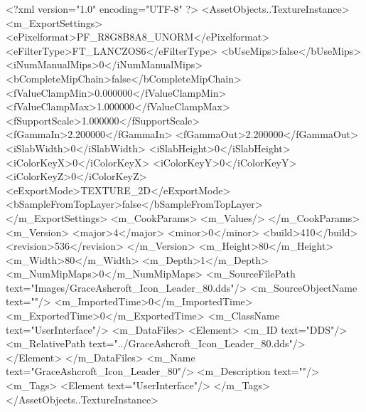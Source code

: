 <?xml version="1.0" encoding="UTF-8" ?>
<AssetObjects..TextureInstance>
	<m_ExportSettings>
		<ePixelformat>PF_R8G8B8A8_UNORM</ePixelformat>
		<eFilterType>FT_LANCZOS6</eFilterType>
		<bUseMips>false</bUseMips>
		<iNumManualMips>0</iNumManualMips>
		<bCompleteMipChain>false</bCompleteMipChain>
		<fValueClampMin>0.000000</fValueClampMin>
		<fValueClampMax>1.000000</fValueClampMax>
		<fSupportScale>1.000000</fSupportScale>
		<fGammaIn>2.200000</fGammaIn>
		<fGammaOut>2.200000</fGammaOut>
		<iSlabWidth>0</iSlabWidth>
		<iSlabHeight>0</iSlabHeight>
		<iColorKeyX>0</iColorKeyX>
		<iColorKeyY>0</iColorKeyY>
		<iColorKeyZ>0</iColorKeyZ>
		<eExportMode>TEXTURE_2D</eExportMode>
		<bSampleFromTopLayer>false</bSampleFromTopLayer>
	</m_ExportSettings>
	<m_CookParams>
		<m_Values/>
	</m_CookParams>
	<m_Version>
		<major>4</major>
		<minor>0</minor>
		<build>410</build>
		<revision>536</revision>
	</m_Version>
	<m_Height>80</m_Height>
	<m_Width>80</m_Width>
	<m_Depth>1</m_Depth>
	<m_NumMipMaps>0</m_NumMipMaps>
	<m_SourceFilePath text="Images/GraceAshcroft_Icon_Leader_80.dds"/>
	<m_SourceObjectName text=""/>
	<m_ImportedTime>0</m_ImportedTime>
	<m_ExportedTime>0</m_ExportedTime>
	<m_ClassName text="UserInterface"/>
	<m_DataFiles>
		<Element>
			<m_ID text="DDS"/>
			<m_RelativePath text="../GraceAshcroft_Icon_Leader_80.dds"/>
		</Element>
	</m_DataFiles>
	<m_Name text="GraceAshcroft_Icon_Leader_80"/>
	<m_Description text=""/>
	<m_Tags>
		<Element text="UserInterface"/>
	</m_Tags>
</AssetObjects..TextureInstance>
